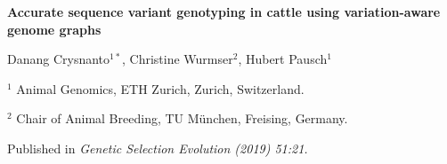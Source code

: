 \documentclass[../main.tex]{subfiles}
\begin{document}
\fi


\graphicspath{{figure/}{../figure/}}

\onehalfspacing

\begin{center}
\Large\bf{Accurate sequence variant genotyping in cattle using variation-aware genome graphs}
\end{center}

\bigskip
\large{Danang Crysnanto$^{1*}$, Christine Wurmser$^{2}$, Hubert Pausch$^{1}$}

\bigskip 


\normalsize
$^1$ Animal Genomics, ETH Zurich, Zurich, Switzerland. 

$^2$ Chair of Animal Breeding, TU München, Freising, Germany. 

\vspace{2 cm}

\vspace{5 cm}

\bigskip
\large Published in \emph{Genetic Selection Evolution (2019) 51:21.}

\normalsize
\newpage
\end{document}
